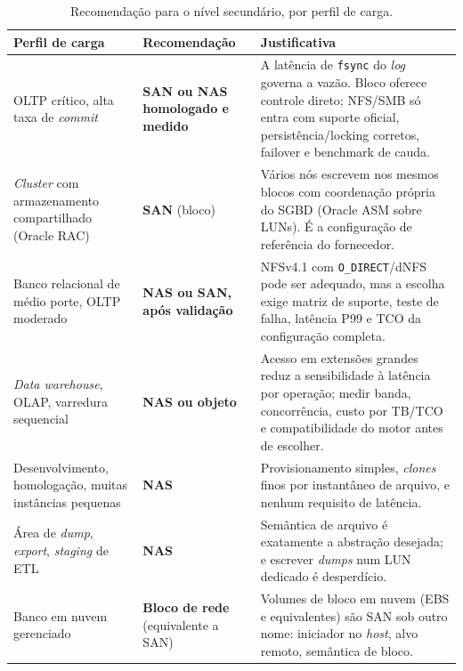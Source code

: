 \documentclass[11pt,a4paper]{article}
\begin{document}
\begin{table}[H]
\centering
\caption{Recomendação para o nível secundário, por perfil de carga.}
\label{tab:recsec}
{\footnotesize
\begin{tabular}{@{}p{3.5cm}p{2.6cm}p{8.4cm}@{}}
\toprule
\textbf{Perfil de carga} & \textbf{Recomendação} & \textbf{Justificativa} \\
\midrule
OLTP crítico, alta taxa de \textit{commit} & \textbf{SAN ou NAS homologado e medido} &
A latência de \texttt{fsync} do \textit{log} governa a vazão. Bloco oferece controle direto;
NFS/SMB só entra com suporte oficial, persistência/locking corretos, failover e benchmark de cauda. \\
\addlinespace
\textit{Cluster} com armazenamento compartilhado (Oracle RAC) & \textbf{SAN} (bloco) &
Vários nós escrevem nos mesmos blocos com coordenação própria do SGBD (Oracle ASM sobre LUNs). É a
configuração de referência do fornecedor. \\
\addlinespace
Banco relacional de médio porte, OLTP moderado & \textbf{NAS ou SAN, após validação} &
NFSv4.1 com \texttt{O\_DIRECT}/dNFS \cite{oracledn} pode ser adequado, mas a escolha exige
matriz de suporte, teste de falha, latência P99 e TCO da configuração completa. \\
\addlinespace
\textit{Data warehouse}, OLAP, varredura sequencial & \textbf{NAS ou objeto} & Acesso em
extensões grandes reduz a sensibilidade à latência por operação; medir banda, concorrência,
custo por TB/TCO e compatibilidade do motor antes de escolher. \\
\addlinespace
Desenvolvimento, homologação, muitas instâncias pequenas & \textbf{NAS} & Provisionamento simples,
\textit{clones} finos por instantâneo de arquivo, e nenhum requisito de latência. \\
\addlinespace
Área de \textit{dump}, \textit{export}, \textit{staging} de ETL & \textbf{NAS} & Semântica de
arquivo é exatamente a abstração desejada; e escrever \textit{dumps} num LUN dedicado é
desperdício. \\
\addlinespace
Banco em nuvem gerenciado & \textbf{Bloco de rede} (equivalente a SAN) & Volumes de bloco em nuvem
(EBS e equivalentes) são SAN sob outro nome: iniciador no \textit{host}, alvo remoto, semântica de
bloco. \\
\bottomrule
\end{tabular}}
\end{table}
\end{document}
